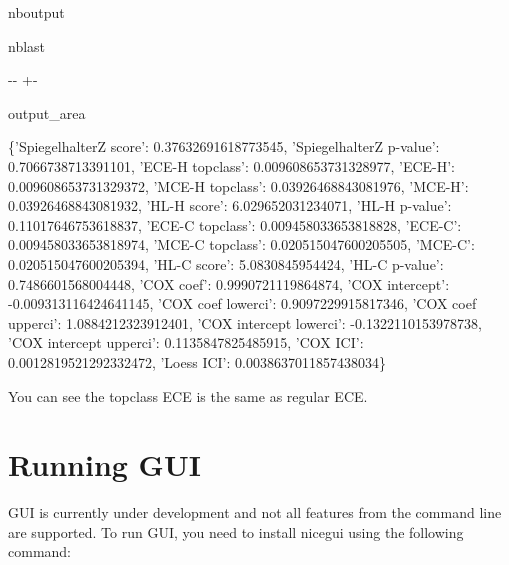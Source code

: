 \documentclass[letterpaper,10pt,english]{sphinxmanual}
\begin{document}
\begin{sphinxuseclass}{nboutput}
\begin{sphinxuseclass}{nblast}
{

\kern-\sphinxverbatimsmallskipamount\kern-\baselineskip
\kern+\FrameHeightAdjust\kern-\fboxrule
\vspace{\nbsphinxcodecellspacing}

\begin{sphinxuseclass}{output_area}
\begin{sphinxuseclass}{}


\begin{sphinxVerbatim}[commandchars=\\\{\}]
\llap{\color{nbsphinxout}[5]:\,\hspace{\fboxrule}\hspace{\fboxsep}}\{'SpiegelhalterZ score': 0.37632691618773545,
 'SpiegelhalterZ p-value': 0.7066738713391101,
 'ECE-H topclass': 0.009608653731328977,
 'ECE-H': 0.009608653731329372,
 'MCE-H topclass': 0.03926468843081976,
 'MCE-H': 0.03926468843081932,
 'HL-H score': 6.029652031234071,
 'HL-H p-value': 0.11017646753618837,
 'ECE-C topclass': 0.009458033653818828,
 'ECE-C': 0.009458033653818974,
 'MCE-C topclass': 0.020515047600205505,
 'MCE-C': 0.020515047600205394,
 'HL-C score': 5.0830845954424,
 'HL-C p-value': 0.7486601568004448,
 'COX coef': 0.9990721119864874,
 'COX intercept': -0.009313116424641145,
 'COX coef lowerci': 0.9097229915817346,
 'COX coef upperci': 1.0884212323912401,
 'COX intercept lowerci': -0.1322110153978738,
 'COX intercept upperci': 0.1135847825485915,
 'COX ICI': 0.0012819521292332472,
 'Loess ICI': 0.0038637011857438034\}
\end{sphinxVerbatim}



\end{sphinxuseclass}
\end{sphinxuseclass}
}

\end{sphinxuseclass}
\end{sphinxuseclass}
\sphinxAtStartPar
You can see the top\sphinxhyphen{}class ECE is the same as regular ECE.

\sphinxstepscope


\chapter{Running GUI}
\label{\detokenize{notebooks/GUI:Running-GUI}}\label{\detokenize{notebooks/GUI::doc}}
\sphinxAtStartPar
GUI is currently under development and not all features from the command line are supported. To run GUI, you need to install nicegui using the following command:
\end{document}

